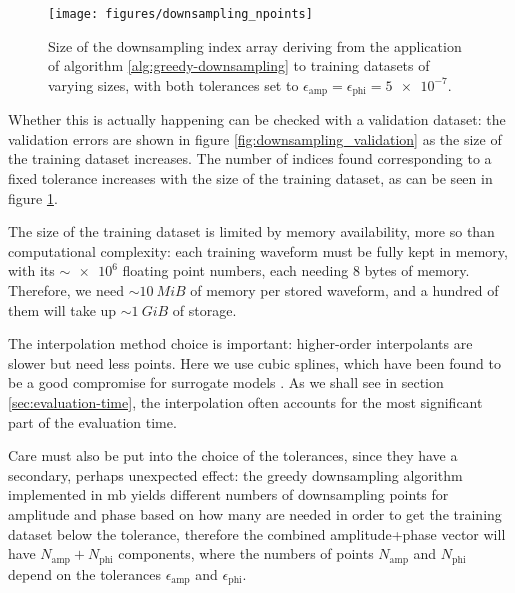 \documentclass[main.tex]{subfiles}
\begin{document}
\begin{figure}[ht]
\centering
\texttt{[image: figures/downsampling\_npoints]}
\caption{Size of the downsampling index array deriving from the application of algorithm \ref{alg:greedy-downsampling} to training datasets of varying sizes, with both tolerances set to \(\epsilon _{\text{amp}} =\epsilon _{\text{phi}} = \num{5e-7}\). }
\label{fig:downsampling_npoints}
\end{figure}

Whether this is actually happening can be checked with a validation dataset: the validation errors are shown in figure \ref{fig:downsampling_validation} as the size of the training dataset increases.
The number of indices found corresponding to a fixed tolerance increases with the size of the training dataset, as can be seen in figure \ref{fig:downsampling_npoints}. 

The size of the training dataset is limited by memory availability, more so than computational complexity: each training waveform must be fully kept in memory, with its \(\sim \num{e6}\) floating point numbers, each needing 8 bytes of memory. 
Therefore, we need \(\sim \SI{10}{MiB}\) of memory per stored waveform, and a hundred of them will take up \( \sim \SI{1}{GiB}\) of storage. 

The interpolation method choice is important: higher-order interpolants are slower but need less points.
Here we use cubic splines, which have been found to be a good compromise for surrogate models \cite{lackeySurrogateModelAlignedspin2019}.
As we shall see in section \ref{sec:evaluation-time}, the interpolation often accounts for the most significant part of the evaluation time.

Care must also be put into the choice of the tolerances, since they have a secondary, perhaps unexpected effect: the greedy downsampling algorithm implemented in \ac{mb} yields different numbers of downsampling points for amplitude and phase based on how many are needed in order to get the training dataset below the tolerance, therefore the combined amplitude+phase vector will have \(N _{\text{amp}} + N _{\text{phi}}\) components, where the numbers of points \(N _{\text{amp}}\) and \(N _{\text{phi}}\) depend on the tolerances \( \epsilon _{\text{amp}}\) and \(\epsilon _{\text{phi}}\). 
\end{document}
